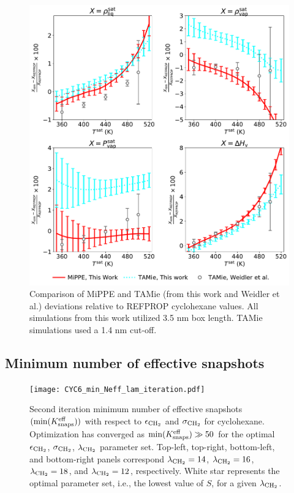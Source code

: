\documentclass[journal=jctc,manuscript=article]{achemso}
\begin{document}
\begin{figure}[H]
	\centering
	\includegraphics[width=5.8in]{CYC6_deviations_MiPPE_TAMie.pdf}
	\caption{Comparison of MiPPE and TAMie (from this work and Weidler et al.) deviations relative to REFPROP cyclohexane values. All simulations from this work utilized 3.5 nm box length. TAMie simulations used a 1.4 nm cut-off.}
	\label{SI fig: CYC6_deviations_MiPPE_TAMie}
\end{figure}

\newpage
\clearpage

\subsection{Minimum number of effective snapshots} \label{SI sec: Min eff}

\begin{figure}[htb!]
	\centering
	\texttt{[image: CYC6\_min\_Neff\_lam\_iteration.pdf]}
	\caption{Second iteration minimum number of effective snapshots $(\min(K_{\rm snaps}^{\rm eff}))$ with respect to $\epsilon_{\rm CH_2}$ and $\sigma_{\rm CH_2}$ for cyclohexane. Optimization has converged as $\min(K_{\rm snaps}^{\rm eff}) \gg 50$ for the optimal $\epsilon_{\rm CH_2}$, $\sigma_{\rm CH_2}$, $\lambda_{\rm CH_2}$ parameter set. Top-left, top-right, bottom-left, and bottom-right panels correspond $\lambda_{\rm CH_2} = 14$, $\lambda_{\rm CH_2} = 16$, $\lambda_{\rm CH_2} = 18$, and $\lambda_{\rm CH_2} = 12$, respectively. White star represents the optimal parameter set, i.e., the lowest value of $S$, for a given $\lambda_{\rm CH_2}$.}
	\label{SI fig:Iterate_Neff_CYC6}
\end{figure}
\end{document}
